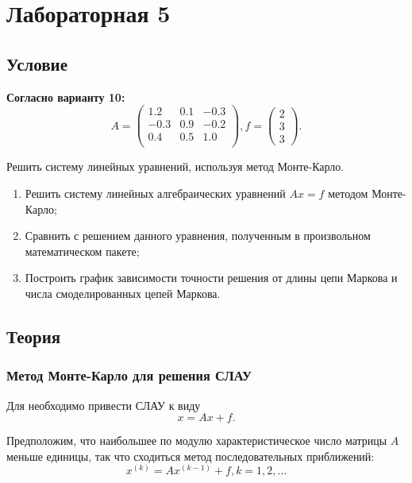 \section{Лабораторная 5}

\subsection{Условие}

\textbf{Согласно варианту 10:}
\begin{equation}
	A = \begin{pmatrix}
		1.2  & 0.1 & -0.3 \\
		-0.3 & 0.9 & -0.2 \\
		0.4  & 0.5 & 1.0  \\
	\end{pmatrix},
	f = \begin{pmatrix}
		2 \\
		3 \\
		3
	\end{pmatrix}.
\end{equation}

Решить систему линейных уравнений, используя метод Монте-Карло.

\begin{enumerate}
	\item Решить систему линейных алгебраических уравнений $Ax = f$ методом Монте-Карло;
	\item Сравнить с решением данного уравнения, полученным в произвольном математическом пакете;
	\item Построить график зависимости точности решения от длины цепи Маркова и числа смоделированных цепей Маркова.
\end{enumerate}

\subsection{Теория}
\subsubsection{Метод Монте-Карло для решения СЛАУ}

Для необходимо привести СЛАУ к виду
\begin{equation}
	x = Ax + f.
\end{equation}

Предположим, что наибольшее по модулю характеристическое число матрицы $A$ меньше единицы, так что сходиться метод последовательных приближений:
\begin{equation}
	x^{(k)} = Ax^{(k-1)} + f, k = 1,2,\ldots
\end{equation}

